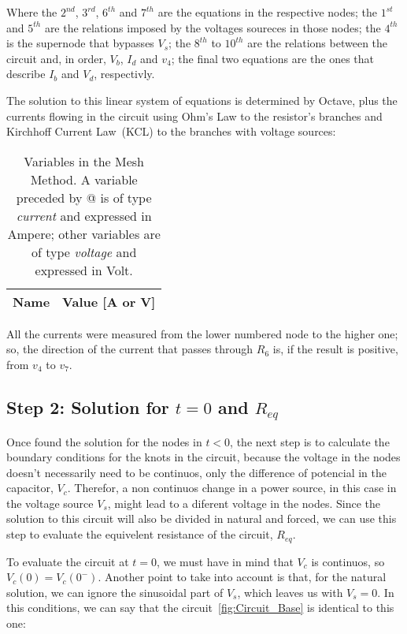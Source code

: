 Where the $2^{nd}$, $3^{rd}$, $6^{th}$ and $7^{th}$ are the equations in the respective nodes; the $1^{st}$ and $5^{th}$ are the relations imposed by the voltages soureces in those nodes; the $4^{th}$ is the supernode that bypasses $V_s$; the $8^{th}$ to $10^{th}$ are the relations between the circuit and, in order, $V_b$, $I_d$ and $v_4$; the final two equations are the ones that describe $I_b$ and $V_d$, respectivly. \par
The solution to this linear system of equations is determined by Octave, plus the currents flowing in the circuit using Ohm's Law to the resistor's branches and Kirchhoff Current Law~(KCL) to the branches with voltage sources:

\begin{table}[h]
  \centering
  \begin{tabular}{|l|r|}
    \hline    
    {\bf Name} & {\bf Value [A or V]} \\ \hline
    
  \end{tabular}
  \caption{Variables in the Mesh Method. A variable preceded by @ is of type {\em current} and expressed in Ampere; other variables are of type {\em voltage} and expressed in Volt.}
  \label{tab:TEO_PASSO1}
\end{table}

All the currents were measured from the lower numbered node to the higher one; so, the direction of the current that passes through $R_6$ is, if the result is positive, from $v_4$ to $v_7$.

\subsection{Step 2: Solution for $t=0$ and $R_{eq}$}

Once found the solution for the nodes in $t<0$, the next step is to calculate the boundary conditions for the knots in the circuit, because the voltage in the nodes doesn't necessarily need to be continuos, only the difference of potencial in the capacitor, $V_c$. Therefor, a non continuos change in a power source, in this case in the voltage source $V_s$, might lead to a diferent voltage in the nodes.
Since the solution to this circuit will also be divided in natural and forced, we can use this step to evaluate the equivelent resistance of the circuit, $R_{eq}$.

To evaluate the circuit at $t=0$, we must have in mind that $V_c$ is continuos, so $V_c(0)=V_c(0^-)$. Another point to take into account is that, for the natural solution, we can ignore the sinusoidal part of $V_s$, which leaves us with $V_s=0$. In this conditions, we can say that the circuit~\ref{fig:Circuit_Base} is identical to this one:

